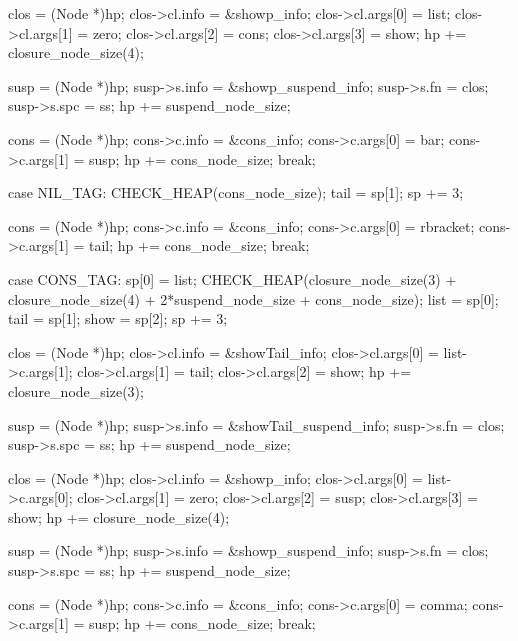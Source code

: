         clos             = (Node *)hp;
        clos->cl.info    = &showp_info;
        clos->cl.args[0] = list;
        clos->cl.args[1] = zero;
        clos->cl.args[2] = cons;
        clos->cl.args[3] = show;
        hp              += closure_node_size(4);

        susp         = (Node *)hp;
        susp->s.info = &showp_suspend_info;
        susp->s.fn   = clos;
        susp->s.spc  = ss;
        hp          += suspend_node_size;

        cons            = (Node *)hp;
        cons->c.info    = &cons_info;
        cons->c.args[0] = bar;
        cons->c.args[1] = susp;
        hp             += cons_node_size;
        break;

    case NIL_TAG:
        CHECK_HEAP(cons_node_size);
        tail = sp[1];
        sp  += 3;

        cons            = (Node *)hp;
        cons->c.info    = &cons_info;
        cons->c.args[0] = rbracket;
        cons->c.args[1] = tail;
        hp             += cons_node_size;
        break;

    case CONS_TAG:
        sp[0] = list;
        CHECK_HEAP(closure_node_size(3) + closure_node_size(4)
                   + 2*suspend_node_size + cons_node_size);
        list = sp[0];
        tail = sp[1];
        show = sp[2];
        sp  += 3;

        clos             = (Node *)hp;
        clos->cl.info    = &showTail_info;
        clos->cl.args[0] = list->c.args[1];
        clos->cl.args[1] = tail;
        clos->cl.args[2] = show;
        hp              += closure_node_size(3);

        susp         = (Node *)hp;
        susp->s.info = &showTail_suspend_info;
        susp->s.fn   = clos;
        susp->s.spc  = ss;
        hp          += suspend_node_size;

        clos             = (Node *)hp;
        clos->cl.info    = &showp_info;
        clos->cl.args[0] = list->c.args[0];
        clos->cl.args[1] = zero;
        clos->cl.args[2] = susp;
        clos->cl.args[3] = show;
        hp              += closure_node_size(4);

        susp         = (Node *)hp;
        susp->s.info = &showp_suspend_info;
        susp->s.fn   = clos;
        susp->s.spc  = ss;
        hp          += suspend_node_size;

        cons            = (Node *)hp;
        cons->c.info    = &cons_info;
        cons->c.args[0] = comma;
        cons->c.args[1] = susp;
        hp             += cons_node_size;
        break;


